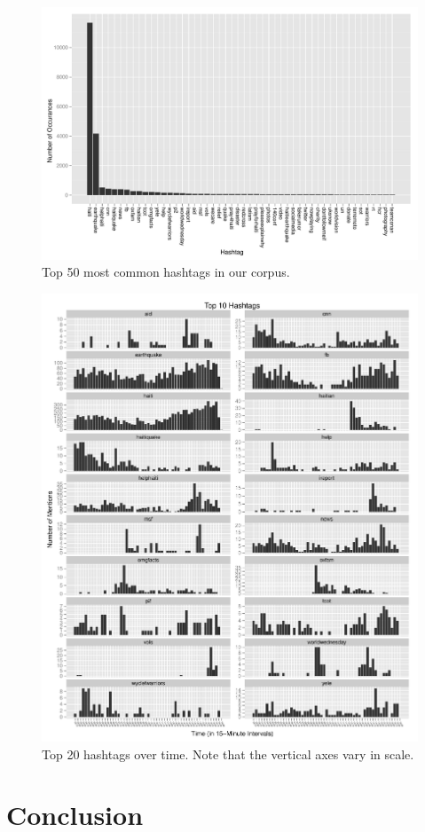 \documentclass[a4paper, 11pt, titlepage]{article}
\begin{document}
\begin{figure}[h]
\centering
\includegraphics[width=\textwidth]{../figures/hashtag_counts.pdf}
\caption{Top 50 most common hashtags in our corpus.}
\label{fig:hashtag_counts}
\end{figure}


\begin{figure}[h]
\centering
\includegraphics[width=\textwidth]{../figures/top-20-hashtags.pdf}
\caption{Top 20 hashtags over time. Note that the vertical axes vary in scale.}
\label{fig:hashtag_counts}
\end{figure}
\section{Conclusion}



\end{document}
